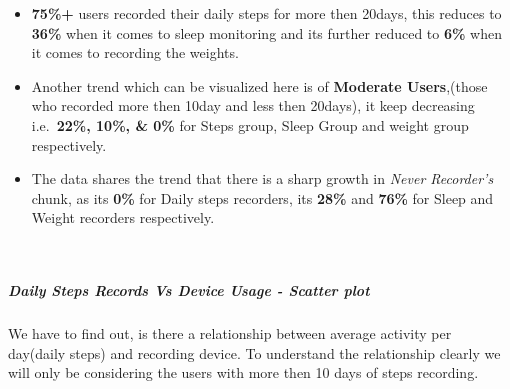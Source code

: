 \documentclass[
]{article}
\newenvironment{Shaded}{\begin{snugshade}}{\end{snugshade}}
\newcommand{\CommentTok}[1]{\textcolor[rgb]{0.56,0.35,0.01}{\textit{#1}}}
\newcommand{\DecValTok}[1]{\textcolor[rgb]{0.00,0.00,0.81}{#1}}
\newcommand{\FunctionTok}[1]{\textcolor[rgb]{0.00,0.00,0.00}{#1}}
\newcommand{\NormalTok}[1]{#1}
\newcommand{\OtherTok}[1]{\textcolor[rgb]{0.56,0.35,0.01}{#1}}
\newcommand{\SpecialCharTok}[1]{\textcolor[rgb]{0.00,0.00,0.00}{#1}}
\newcommand{\StringTok}[1]{\textcolor[rgb]{0.31,0.60,0.02}{#1}}
\providecommand{\tightlist}{%
  \setlength{\itemsep}{0pt}\setlength{\parskip}{0pt}}
\begin{document}
\begin{itemize}
\tightlist
\item
  \textbf{75\%+} users recorded their daily steps for more then 20days,
  this reduces to \textbf{36\%} when it comes to sleep monitoring and
  its further reduced to \textbf{6\%} when it comes to recording the
  weights.
\item
  Another trend which can be visualized here is of \textbf{Moderate
  Users},(those who recorded more then 10day and less then 20days), it
  keep decreasing i.e.~\textbf{22\%, 10\%, \& 0\%} for Steps group,
  Sleep Group and weight group respectively.
\item
  The data shares the trend that there is a sharp growth in \emph{Never
  Recorder's} chunk, as its \textbf{0\%} for Daily steps recorders, its
  \textbf{28\%} and \textbf{76\%} for Sleep and Weight recorders
  respectively.\\
  \strut \\
\end{itemize}

\hypertarget{daily-steps-records-vs-device-usage---scatter-plot}{%
\subparagraph{\texorpdfstring{\textbf{Daily Steps Records Vs Device
Usage - Scatter
plot}}{Daily Steps Records Vs Device Usage - Scatter plot}}\label{daily-steps-records-vs-device-usage---scatter-plot}}

We have to find out, is there a relationship between average activity
per day(daily steps) and recording device. To understand the
relationship clearly we will only be considering the users with more
then 10 days of steps recording.

\begin{Shaded}
\end{Shaded}
\end{document}
